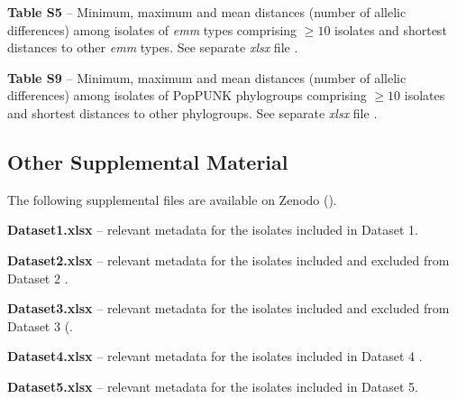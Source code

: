 \newpage
\noindent \textbf{Table S5} – Minimum, maximum and mean distances (number of allelic differences) among isolates of \textit{emm} types comprising $\geq10$ isolates and shortest distances to other \textit{emm} types. See separate \textit{xlsx} file \cite{friaes_supplemental_2023}.

\newpage


\newpage


\newpage
\begin{landscape}
\vspace*{\fill}
    
\vspace*{\fill}
\end{landscape}

\newpage
\noindent \textbf{Table S9} – Minimum, maximum and mean distances (number of allelic differences) among isolates of \ac{PopPUNK} phylogroups comprising  $\geq10$ isolates and shortest distances to other phylogroups. See separate \textit{xlsx} file \cite{friaes_supplemental_2023}.

\newpage
\begin{landscape}
\vspace*{\fill}
    
\vspace*{\fill}
\end{landscape}

\subsection{Other Supplemental Material} \label{ssec:supplemental_material_other}

\noindent The following supplemental files are available on Zenodo (\cite{friaes_supplemental_2023}).

\noindent \textbf{Dataset1.xlsx} – relevant metadata for the isolates included in Dataset 1.

\noindent \textbf{Dataset2.xlsx} – relevant metadata for the isolates included and excluded from Dataset 2 \cite{davies_atlas_2019}.

\noindent \textbf{Dataset3.xlsx} – relevant metadata for the isolates included and excluded from Dataset 3 (\cite{coelho_genomic_2019}.

\noindent \textbf{{Dataset4.xlsx}} – relevant metadata for the isolates included in Dataset 4 \cite{lynskey_emergence_2019}.

\noindent \textbf{Dataset5.xlsx} – relevant metadata for the isolates included in Dataset 5.

